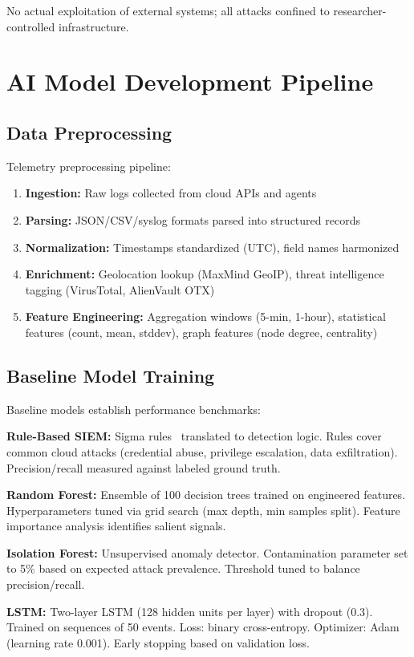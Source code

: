 No actual exploitation of external systems; all attacks confined to researcher-controlled infrastructure.

\section{AI Model Development Pipeline}\label{sec:method-aidev}
\subsection{Data Preprocessing}
Telemetry preprocessing pipeline:
\begin{enumerate}
    \item \textbf{Ingestion:} Raw logs collected from cloud APIs and agents
    \item \textbf{Parsing:} JSON/CSV/syslog formats parsed into structured records
    \item \textbf{Normalization:} Timestamps standardized (UTC), field names harmonized
    \item \textbf{Enrichment:} Geolocation lookup (MaxMind GeoIP), threat intelligence tagging (VirusTotal, AlienVault OTX)
    \item \textbf{Feature Engineering:} Aggregation windows (5-min, 1-hour), statistical features (count, mean, stddev), graph features (node degree, centrality)
\end{enumerate}

\subsection{Baseline Model Training}
Baseline models establish performance benchmarks:

\textbf{Rule-Based SIEM:} Sigma rules~\cite{sigma2023} translated to detection logic. Rules cover common cloud attacks (credential abuse, privilege escalation, data exfiltration). Precision/recall measured against labeled ground truth.

\textbf{Random Forest:} Ensemble of 100 decision trees trained on engineered features. Hyperparameters tuned via grid search (max depth, min samples split). Feature importance analysis identifies salient signals.

\textbf{Isolation Forest:} Unsupervised anomaly detector. Contamination parameter set to 5\% based on expected attack prevalence. Threshold tuned to balance precision/recall.

\textbf{LSTM:} Two-layer LSTM (128 hidden units per layer) with dropout (0.3). Trained on sequences of 50 events. Loss: binary cross-entropy. Optimizer: Adam (learning rate 0.001). Early stopping based on validation loss.

